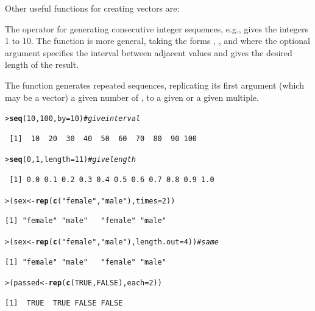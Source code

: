 \documentclass[10pt,krantz2]{krantz}\usepackage[]{graphicx}\usepackage[]{color}
\makeatletter
\newcommand{\hlnum}[1]{\textcolor[rgb]{0.686,0.059,0.569}{#1}}%
\newcommand{\hlstr}[1]{\textcolor[rgb]{0.192,0.494,0.8}{#1}}%
\newcommand{\hlcom}[1]{\textcolor[rgb]{0.678,0.584,0.686}{\textit{#1}}}%
\newcommand{\hlstd}[1]{\textcolor[rgb]{0.345,0.345,0.345}{#1}}%
\newcommand{\hlkwb}[1]{\textcolor[rgb]{0.69,0.353,0.396}{#1}}%
\newcommand{\hlkwc}[1]{\textcolor[rgb]{0.333,0.667,0.333}{#1}}%
\newcommand{\hlkwd}[1]{\textcolor[rgb]{0.737,0.353,0.396}{\textbf{#1}}}%
\newenvironment{kframe}{%
 \def\at@end@of@kframe{}%
 \ifinner\ifhmode%
  \def\at@end@of@kframe{\end{minipage}}%
  \begin{minipage}{\columnwidth}%
 \fi\fi%
 \def\FrameCommand##1{\hskip\@totalleftmargin \hskip-\fboxsep
 \colorbox{shadecolor}{##1}\hskip-\fboxsep
     \hskip-\linewidth \hskip-\@totalleftmargin \hskip\columnwidth}%
 \MakeFramed {\advance\hsize-\width
   \@totalleftmargin\z@ \linewidth\hsize
   \@setminipage}}%
 {\par\unskip\endMakeFramed%
 \at@end@of@kframe}
\newenvironment{knitrout}{}{} %
\renewenvironment{knitrout}{\small\renewcommand{\baselinestretch}{.85}}{} %
\makeatother
\begin{document}
Other useful functions for creating vectors are:
\begin{itemize*}
  \item The \code{:} operator for generating consecutive integer sequences, e.g.,
   gives the integers 1 to 10.  The  function is more general, taking the forms
,
, and
 where the optional argument  specifies the interval between adjacent values and  gives the desired length of the
result.

  \item The  function generates repeated sequences, replicating
  its first argument (which may be a vector) a given number of ,
  to a given  or  a given multiple.
\end{itemize*}

\begin{knitrout}
\color{fgcolor}\begin{kframe}
\begin{alltt}
\hlstd{> }\hlkwd{seq}\hlstd{(}\hlnum{10}\hlstd{,} \hlnum{100}\hlstd{,} \hlkwc{by} \hlstd{=} \hlnum{10}\hlstd{)}      \hlcom{# give interval}
\end{alltt}
\begin{verbatim}
 [1]  10  20  30  40  50  60  70  80  90 100
\end{verbatim}
\begin{alltt}
\hlstd{> }\hlkwd{seq}\hlstd{(}\hlnum{0}\hlstd{,} \hlnum{1}\hlstd{,} \hlkwc{length} \hlstd{=} \hlnum{11}\hlstd{)}     \hlcom{# give length}
\end{alltt}
\begin{verbatim}
 [1] 0.0 0.1 0.2 0.3 0.4 0.5 0.6 0.7 0.8 0.9 1.0
\end{verbatim}
\begin{alltt}
\hlstd{> }\hlstd{(sex} \hlkwb{<-} \hlkwd{rep}\hlstd{(}\hlkwd{c}\hlstd{(}\hlstr{"female"}\hlstd{,} \hlstr{"male"}\hlstd{),} \hlkwc{times} \hlstd{=} \hlnum{2}\hlstd{))}
\end{alltt}
\begin{verbatim}
[1] "female" "male"   "female" "male"  
\end{verbatim}
\begin{alltt}
\hlstd{> }\hlstd{(sex} \hlkwb{<-} \hlkwd{rep}\hlstd{(}\hlkwd{c}\hlstd{(}\hlstr{"female"}\hlstd{,} \hlstr{"male"}\hlstd{),} \hlkwc{length.out} \hlstd{=} \hlnum{4}\hlstd{))}  \hlcom{# same}
\end{alltt}
\begin{verbatim}
[1] "female" "male"   "female" "male"  
\end{verbatim}
\begin{alltt}
\hlstd{> }\hlstd{(passed} \hlkwb{<-} \hlkwd{rep}\hlstd{(}\hlkwd{c}\hlstd{(}\hlnum{TRUE}\hlstd{,} \hlnum{FALSE}\hlstd{),} \hlkwc{each} \hlstd{=} \hlnum{2}\hlstd{))}
\end{alltt}
\begin{verbatim}
[1]  TRUE  TRUE FALSE FALSE
\end{verbatim}
\end{kframe}
\end{knitrout}
\end{document}
